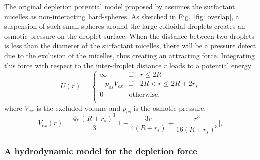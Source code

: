 The original depletion potential model proposed by \cite{Asakura_1958} assumes the surfactant micelles as non-interacting hard-spheres. As sketched in Fig.\ \ref{fig: overlap}, a suspension of such small spheres around the large colloidal droplets creates an osmotic pressure on the droplet surface. When the distance between two droplets is less than the diameter of the surfactant micelles, there will be a pressure defect due to the exclusion of the micelles, thus creating an attracting force. Integrating this force with respect to the inter-droplet distance $r$ leads to a potential energy
\begin{equation}
    U(r)=
    \begin{cases}
        \infty & \textrm{if} \quad r \leqslant 2R \\
        - p_{os}V_{ex} & \textrm{if} \quad 2R < r \leqslant 2R+2r_s  \\
        0 \quad & \textrm{otherwise}, \\
    \end{cases}
    \label{pot}
\end{equation}
where $V_{ex}$ is the excluded volume and $p_{os}$ is the osmotic pressure. 
\begin{equation}
    V_{ex}(r) = \frac{4\pi (R+r_s)^3}{3}\bigg[ 1- \frac{3r}{4(R+r_s)}+\frac{r^3}{16(R+r_s)^3} \bigg],
    \label{pot V}
\end{equation}



\subsubsection{A hydrodynamic model for the depletion force}

